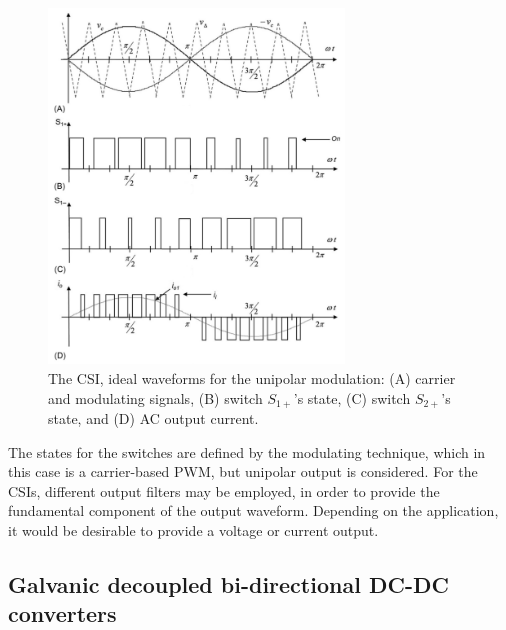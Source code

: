 \begin{figure}[!ht]
        \centering
        \includegraphics[width=0.7\textwidth]{EMPC_PNG_Pics/CSIwaves.png}
        \caption{The CSI, ideal waveforms for the unipolar modulation: (A) carrier and modulating signals, (B) switch $S_{1+}$'s state, (C) switch $S_{2+}$'s state, and (D) AC output current.}
        \label{BASICCSR:fig:CSIwave}
    \end{figure}

The states for the switches are defined by the modulating technique, which in this case is a carrier-based PWM, but unipolar output is considered. For the CSIs, different output filters may be employed, in order to provide the fundamental component of the output waveform. Depending on the application, it would be desirable to provide a voltage or current output.

\subsection{Galvanic decoupled bi-directional DC-DC converters}\label{BASICCSR:sec:DCDC}

